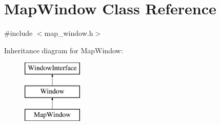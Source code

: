 \hypertarget{classMapWindow}{\section{Map\-Window Class Reference}
\label{classMapWindow}
}


{\ttfamily \#include $<$map\-\_\-window.\-h$>$}

Inheritance diagram for Map\-Window\-:\begin{figure}[H]
\begin{center}
\leavevmode
\includegraphics[height=3.000000cm]{classMapWindow}
\end{center}
\end{figure}
